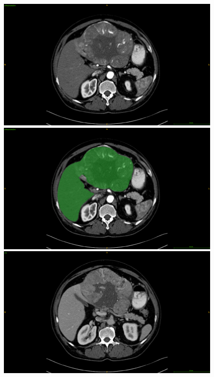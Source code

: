 \documentclass[]{article}
\begin{document}
\begin{figure}[ht!]
	\centering
	\begin{minipage}{0.45\linewidth}
		\includegraphics[width=0.9\linewidth]{../HistologicalGradePrediction/images/ResizeTCIA_CECTLiver_prediction_TCGA-DD-A11A_slice42_AR_raw}
	\end{minipage}
	\hspace{0.3cm}
	\begin{minipage}{0.45\linewidth}
		\includegraphics[width=0.9\linewidth]{../HistologicalGradePrediction/images/ResizeTCIA_CECTLiver_prediction_TCGA-DD-A11A_slice42_AR_green_liver}
	\end{minipage}
	\vspace{0.8cm}
	\begin{minipage}{0.45\linewidth}
		\includegraphics[width=0.9\linewidth]{../HistologicalGradePrediction/images/ResizeTCIA_CECTLiver_prediction_TCGA-DD-A11A_slice42_raw}

\end{minipage}
\end{figure}
\end{document}
